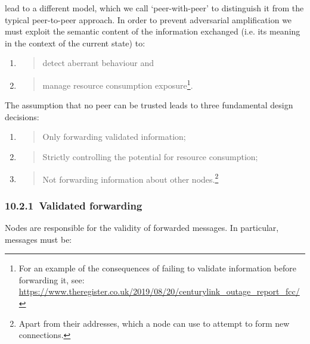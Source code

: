 \documentclass[]{article}
\begin{document}
lead to a different model, which we call `peer-with-peer' to distinguish
it from the typical peer-to-peer approach. In order to prevent
adversarial amplification we must exploit the semantic content of the
information exchanged (i.e. its meaning in the context of the current
state) to:

\begin{enumerate}
\def\labelenumi{\arabic{enumi}.}
\item
  \begin{quote}
  detect aberrant behaviour and
  \end{quote}
\item
  \begin{quote}
  manage resource consumption exposure\footnote{For an example of the
    consequences of failing to validate information before forwarding
    it, see:
    \href{https://www.theregister.co.uk/2019/08/20/centurylink_outage_report_fcc/}{{https://www.theregister.co.uk/2019/08/20/centurylink\_outage\_report\_fcc/}}}.
  \end{quote}
\end{enumerate}

The assumption that no peer can be trusted leads to three fundamental
design decisions:

\begin{enumerate}
\def\labelenumi{\arabic{enumi}.}
\item
  \begin{quote}
  Only forwarding validated information;
  \end{quote}
\item
  \begin{quote}
  Strictly controlling the potential for resource consumption;
  \end{quote}
\item
  \begin{quote}
  Not forwarding information about other nodes.\footnote{Apart from
    their addresses, which a node can use to attempt to form new
    connections.}
  \end{quote}
\end{enumerate}

\hypertarget{validated-forwarding}{%
\subsubsection{​10.2.1​~Validated
forwarding}\label{validated-forwarding}}

Nodes are responsible for the validity of forwarded messages. In
particular, messages must be:
\end{document}
